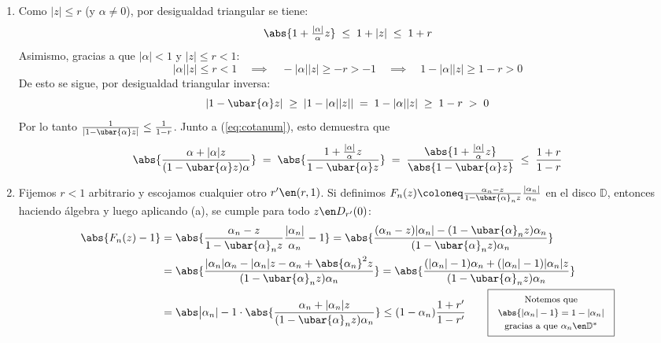 \begin{sol}
\begin{enumerate}[label=(\alph*), leftmargin = 1.5em]
\item 
Como $|z|\le r$ (y $\alpha\neq 0$), por desigualdad triangular se tiene:
\begin{equation}\label{eq:cotanum}
\abs{1+\tfrac{|\alpha|}{\alpha}z}
\;\leq\; 1 + |z|
\;\leq\; 1 + r 
\end{equation}
Asimismo, gracias a que $|\alpha| < 1$ y $|z| \le r < 1$: 
\[
|\alpha||z| \le r <1
\quad\implies\quad
-|\alpha||z| \ge -r > -1
\quad\implies\quad
1-|\alpha||z| \ge 1-r >0
\]
De esto se sigue, por desigualdad triangular inversa:
\[
|1-\ubar{\alpha}z| 
\;\ge\; | 1 -|\alpha||z||
\;=\; 1-|\alpha||z|
\;\ge\; 1-r
\;>\; 0
\]
Por lo tanto $\frac{1}{|1-\ubar{\alpha}z|} \leq \frac{1}{1-r}$. Junto a (\ref{eq:cotanum}), esto demuestra que
\[
\abs{ \frac{\alpha+|\alpha|z}{(1-\ubar{\alpha}z)\alpha} }
\;=\; \abs{ \frac{ 1+\tfrac{|\alpha|}{\alpha}z }{ 1 - \ubar{\alpha}z } } 
\;=\; \frac{ \abs{1+\tfrac{|\alpha|}{\alpha}z} }{ \abs{1 - \ubar{\alpha}z} }
\;\le\; \frac{1+r}{1-r}
\]
\item 
Fijemos $r<1$ arbitrario y escojamos cualquier otro $r' \en (r,1)$. Si definimos $F_{n}(z) \coloneq \frac{\alpha_n - z}{1 - \ubar{\alpha}_n z} \frac{|\alpha_n|}{\alpha_n}$ en el disco $\mathbb{D}$, entonces haciendo álgebra y luego aplicando (a), se cumple para todo $z\en D_{r'}(0)$:
\begin{align*}
\abs{F_{n}(z) - 1}
&= \abs{ 
    \frac{\alpha_n - z}{1 - \ubar{\alpha}_n z} \frac{|\alpha_n|}{\alpha_n} - 1
}
= \abs{
    \frac{ (\alpha_n - z)|\alpha_n| - (1 - \ubar{\alpha}_n z)\alpha_n }{ (1 - \ubar{\alpha}_n z)\alpha_n }
}\\
&= \abs{
    \frac{ |\alpha_n|\alpha_n - |\alpha_n|z - \alpha_n + \abs{\alpha_n}^2 z }{ (1 - \ubar{\alpha}_n z)\alpha_n }
}
= \abs{
    \frac{ (|\alpha_n|-1)\alpha_n + (|\alpha_n|-1)|\alpha_n|z }{ (1 - \ubar{\alpha}_n z)\alpha_n }
}\\
&= \abs\big{|\alpha_n|-1} \cdot \abs{
    \frac{ \alpha_n + |\alpha_n|z }{ (1 - \ubar{\alpha}_n z)\alpha_n }
}
\leq (1-\alpha_n)\frac{1+r'}{1-r'}
\qquad 
\boxed{
\begin{tabular}{c}\footnotesize
    Notemos que\\\footnotesize
    $\abs{|\alpha_n|-1} = 1- |\alpha_n|$\\\footnotesize
    gracias a que $\alpha_n \en \mathbb{D}^*$
\end{tabular}
}
\end{align*}

\end{enumerate}
\end{sol}
